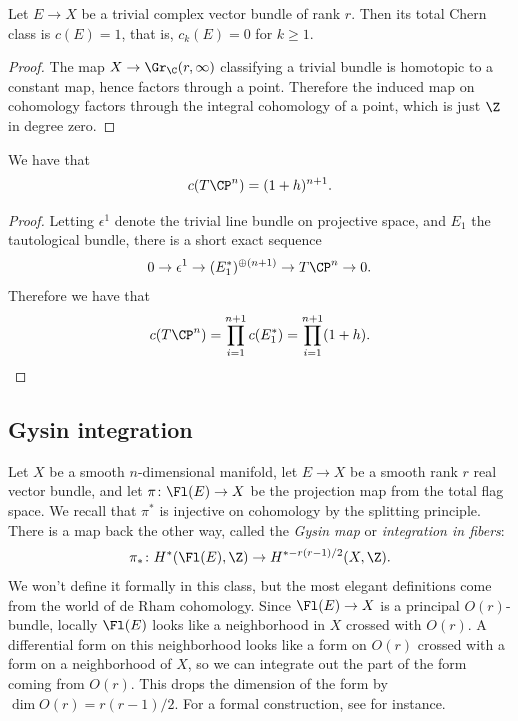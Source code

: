 \documentclass[11pt]{book}
\begin{document}
\begin{proposition}
Let $E \to X$ be a trivial complex vector bundle of rank $r$. Then its total Chern class is $c(E) =1$, that is, $c_k(E) = 0$ for $k\ge1$.
\end{proposition}
\begin{proof}
The map $X \to \Gr_\C(r,\infty)$ classifying a trivial bundle is homotopic to a constant map, hence factors through a point. Therefore the induced map on cohomology factors through the integral cohomology of a point, which is just $\Z$ in degree zero.
\end{proof}

\begin{proposition}\label{prop:chern-numbers-cpn} 
We have that
\begin{align*}
    c(T\CP^n) = (1+h)^{n+1}.
\end{align*}
\end{proposition}
\begin{proof} Letting $\epsilon^1$ denote the trivial line bundle on projective space, and $E_1$ the tautological bundle, there is a short exact sequence
\begin{align*}
    0 \to \epsilon^1 \to (E_1^\ast)^{\oplus (n+1)} \to T\CP^n \to 0.
\end{align*}
Therefore we have that
\begin{align*}
    c(T\CP^n) = \prod_{i=1}^{n+1}c(E_1^\ast) = \prod_{i=1}^{n+1}(1+h).
\end{align*}
\end{proof}

\subsection{Gysin integration}

Let $X$ be a smooth $n$-dimensional manifold, let $E\to X$ be a smooth rank $r$ real vector bundle, and let $\pi \colon \Fl(E) \to X$ be the projection map from the total flag space. We recall that $\pi^\ast$ is injective on cohomology by the splitting principle. There is a map back the other way, called the \emph{Gysin map} or \emph{integration in fibers}:
\begin{align*}
    \pi_\ast \colon H^\ast(\Fl(E),\Z) \to H^{\ast - r(r-1)/2}(X,\Z).
\end{align*}
We won't define it formally in this class, but the most elegant definitions come from the world of de Rham cohomology. Since $\Fl(E) \to X$ is a principal $O(r)$-bundle, locally $\Fl(E)$ looks like a neighborhood in $X$ crossed with $O(r)$. A differential form on this neighborhood looks like a form on $O(r)$ crossed with a form on a neighborhood of $X$, so we can integrate out the part of the form coming from $O(r)$. This drops the dimension of the form by $\dim O(r) = r(r-1)/2$. For a formal construction, see \cite[\S6]{BottTu} for instance.
\end{document}
